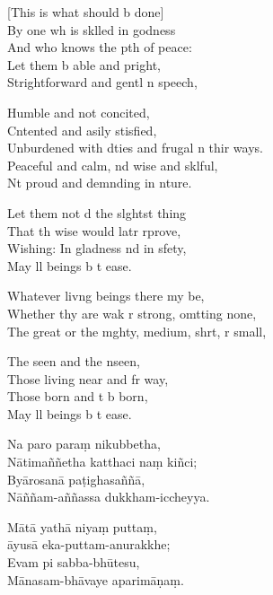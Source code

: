 \begin{leader}
\end{leader}

[This is what should b done]\\
By one wh is sklled in godness\\
And who knows the pth of peace:\\
Let them b able and pright,\\
Strightforward and gentl n speech,

Humble and not concited,\\
Cntented and asily stisfied,\\
Unburdened with dties and frugal n thir ways.\\
Peaceful and calm, nd wise and sklful,\\
Nt proud and demnding in nture.

Let them not d the slghtst thing\\
That th wise would latr rprove,\\
Wishing: In gladness nd in sfety,\\
May ll beings b t ease.

Whatever livng beings there my be,\\
Whether thy are wak r strong, omtting none,\\
The great or the mghty, medium, shrt, r small,

The seen and the nseen,\\
Those living near and fr way,\\
Those born and t b born,\\
May ll beings b t ease.

\clearpage

Na paro paraṃ nikubbetha,\\%
Nātimaññetha katthaci naṃ kiñci;\\
Byārosanā paṭighasaññā,\\
Nāññam-aññassa dukkham-iccheyya.

Mātā yathā niyaṃ puttaṃ,\\
āyusā eka-puttam-anurakkhe;\\
Evam pi sabba-bhūtesu,\\
Mānasam-bhāvaye aparimāṇaṃ.

